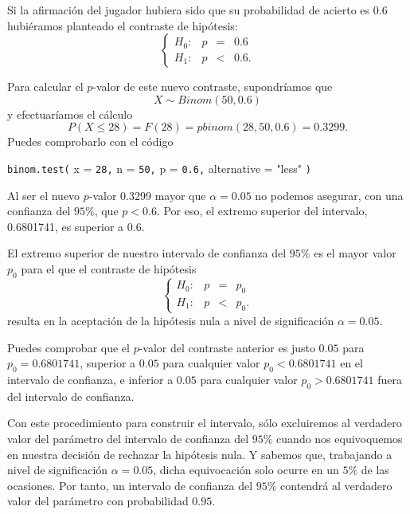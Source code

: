 \documentclass[
  notoc,
  nobib,
  degree=inf]{mnye}
\newenvironment{Shaded}{\begin{snugshade}}{\end{snugshade}}
\newcommand{\AttributeTok}[1]{\textcolor[rgb]{0.77,0.63,0.00}{#1}}
\newcommand{\DecValTok}[1]{\textcolor[rgb]{0.00,0.00,0.81}{#1}}
\newcommand{\FloatTok}[1]{\textcolor[rgb]{0.00,0.00,0.81}{#1}}
\newcommand{\FunctionTok}[1]{\textcolor[rgb]{0.00,0.00,0.00}{#1}}
\newcommand{\NormalTok}[1]{#1}
\newcommand{\StringTok}[1]{\textcolor[rgb]{0.31,0.60,0.02}{#1}}
\renewcommand{\DecValTok}[1]{\textcolor[RGB]{64, 160, 112}{\texttt{#1}}}
\renewcommand{\FloatTok}[1]{\textcolor[RGB]{64, 160, 112}{\texttt{#1}}}
\renewcommand{\FunctionTok}[1]{\textcolor[rgb]{0.13,0.29,0.53}{\texttt{#1}}}
\renewcommand{\NormalTok}[1]{\texttt{#1}}
\begin{document}
Si la afirmación del jugador hubiera sido que su probabilidad de acierto es \(0.6\) hubiéramos planteado el contraste de hipótesis:
\[
  \left\{
  \begin{array}{lrcl}
    H_0:&p&=&0.6\\
    H_1:&p&<&0.6.
  \end{array}
  \right.
\]

Para calcular el \(p\)-valor de este nuevo contraste, supondríamos que \[X\sim Binom(50,0.6)\] y efectuaríamos el cálculo
\[
    P(X\le 28) = F(28) = pbinom(28,50,0.6) =0.3299.
\]
Puedes comprobarlo con el código

\begin{Shaded}
\begin{Highlighting}[]
\FunctionTok{binom.test}\NormalTok{(}
  \AttributeTok{x =} \DecValTok{28}\NormalTok{,}
  \AttributeTok{n =} \DecValTok{50}\NormalTok{,}
  \AttributeTok{p =} \FloatTok{0.6}\NormalTok{,}
  \AttributeTok{alternative =} \StringTok{"less"}
\NormalTok{)}
\end{Highlighting}
\end{Shaded}

Al ser el nuevo \(p\)-valor 0.3299 mayor que \(\alpha = 0.05\) no podemos asegurar, con una confianza del \(95\%\), que \(p<0.6\). Por eso, el extremo superior del intervalo, 0.6801741, es superior a \(0.6\).

El extremo superior de nuestro intervalo de confianza del \(95\%\) es el mayor valor \(p_{0}\) para el que el contraste de hipótesis
\[
  \left\{
  \begin{array}{lrcl}
    H_0:&p&=&p_{0}\\
    H_1:&p&<&p_{0}.
  \end{array}
  \right.
\]
resulta en la aceptación de la hipótesis nula a nivel de significación \(\alpha = 0.05\).

Puedes comprobar que el \(p\)-valor del contraste anterior es justo \(0.05\) para \(p_0 = 0.6801741\), superior a \(0.05\) para cualquier valor \(p_0<0.6801741\) en el intervalo de confianza, e inferior a \(0.05\) para cualquier valor \(p_0>0.6801741\) fuera del intervalo de confianza.

Con este procedimiento para construir el intervalo, sólo excluiremos al verdadero valor del parámetro del intervalo de confianza del \(95\%\) cuando nos equivoquemos en nuestra decisión de rechazar la hipótesis nula. Y sabemos que, trabajando a nivel de significación \(\alpha=0.05\), dicha equivocación solo ocurre en un \(5\%\) de las ocasiones. Por tanto, un intervalo de confianza del \(95\%\) contendrá al verdadero valor del parámetro con probabilidad \(0.95\).
\end{document}
